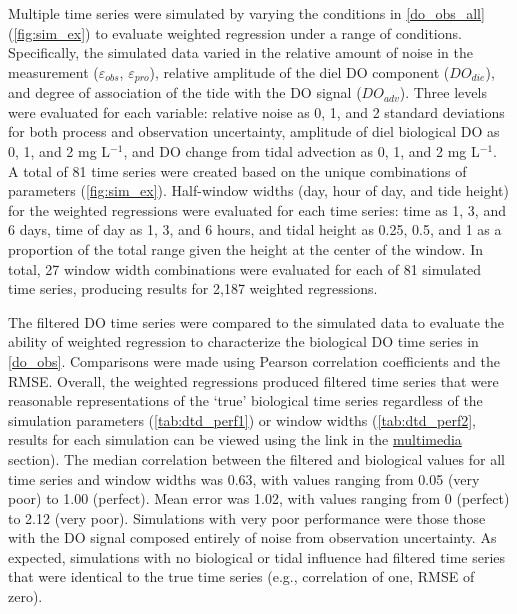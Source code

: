 \documentclass[letterpaper,12pt,oneside]{article}\usepackage[]{graphicx}\usepackage[]{color}
\begin{document}
Multiple time series were simulated by varying the conditions in \cref{do_obs_all} (\cref{fig:sim_ex}) to evaluate weighted regression under a range of conditions. Specifically, the simulated data varied in the relative amount of noise in the measurement ($\varepsilon_{obs}$, $\varepsilon_{pro}$), relative amplitude of the diel \ac{DO} component ($DO_{die}$), and degree of association of the tide with the \ac{DO} signal ($DO_{adv}$).  Three levels were evaluated for each variable: relative noise as 0, 1, and 2 standard deviations for both process and observation uncertainty, amplitude of diel biological \ac{DO} as 0, 1, and 2 mg L$^{-1}$, and \ac{DO} change from tidal advection as 0, 1, and 2 mg L$^{-1}$. A total of 81 time series were created based on the unique combinations of parameters (\cref{fig:sim_ex}).  Half-window widths (day, hour of day, and tide height) for the weighted regressions were evaluated for each time series: time as 1, 3, and 6 days, time of day as 1, 3, and 6 hours, and tidal height as 0.25, 0.5, and 1 as a proportion of the total range given the height at the center of the window.  In total, 27 window width combinations were evaluated for each of 81 simulated time series, producing results for 2,187 weighted regressions.

The filtered \ac{DO} time series were compared to the simulated data to evaluate the ability of weighted regression to characterize the biological \ac{DO} time series in \cref{do_obs}. Comparisons were made using Pearson correlation coefficients and the \ac{RMSE}.  Overall, the weighted regressions produced filtered time series that were reasonable representations of the `true' biological time series regardless of the simulation parameters (\cref{tab:dtd_perf1}) or window widths (\cref{tab:dtd_perf2}, results for each simulation can be viewed using the link in the \hyperref[multi]{multimedia} section).  The median correlation between the filtered and biological values for all time series and window widths was 0.63, with values ranging from 0.05 (very poor) to 1.00 (perfect).  Mean error was 1.02, with values ranging from 0 (perfect) to 2.12 (very poor).  Simulations with very poor performance were those those with the \ac{DO} signal composed entirely of noise from observation uncertainty. As expected, simulations with no biological or tidal influence had filtered time series that were identical to the true time series (e.g., correlation of one, \ac{RMSE} of zero).  
\end{document}

